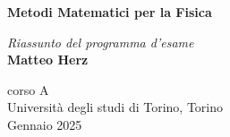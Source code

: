 \begin{titlepage}
   \begin{center}
       \vspace*{8cm}
        
       \textbf{\LARGE Metodi Matematici per la Fisica}

       \vspace{0.5cm}
	   \textit{\Large Riassunto del programma d'esame}\\
	   \vspace{0.5cm}
	   \textbf{\large Matteo Herz}

       \vfill
            
       
            
       \vspace{0.8cm}
     
       
            
       corso A\\
       Università degli studi di Torino, Torino\\
       Gennaio 2025\\
       
            
   \end{center}
\end{titlepage}

